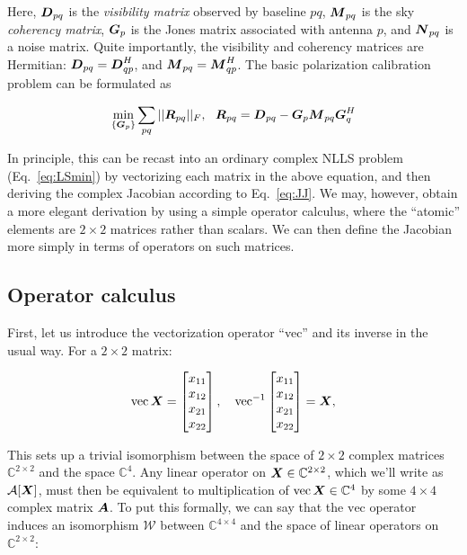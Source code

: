 \documentclass[useAMS,usenatbib]{mn2e}
\makeatletter
\newcommand{\COMPLEX}{\mathbb{C}}
\newcommand{\mat}[1]{{\bmath{#1}}}
\newcommand{\DD}{\mat{D}}
\newcommand{\MM}{\mat{M}}
\newcommand{\RR}{\mat{R}}
\newcommand{\GG}{\mat{G}}
\newcommand{\Matrix}[2]{\left [ \begin{array}{@{}#1@{}}#2\end{array} \right ]}
\makeatother
\begin{document}
Here, $\DD_{pq}$ is the \emph{visibility matrix} observed by baseline $pq$, $\MM_{pq}$ is the sky \emph{coherency matrix}, $\GG_p$ is the Jones matrix associated with antenna $p$, and $\mat{N}_{pq}$ is a noise matrix. Quite importantly, the visibility and coherency matrices are Hermitian: 
$\DD_{pq}=\DD^H_{qp}$, and $\MM_{pq}=\MM^H_{qp}$. The basic polarization calibration problem can be formulated as

\begin{equation}
\label{eq:cal:DI:pol}
\min_{\{\GG_p\}}\sum_{pq}||\RR_{pq}||_F,~~
\RR_{pq} = \DD_{pq}-\GG_p \MM_{pq} \GG^H_q
\end{equation}



In principle, this can be recast into an ordinary complex NLLS problem (Eq.~\ref{eq:LSmin}) by vectorizing each 
matrix in the above equation,  and then deriving the complex Jacobian according to Eq.~\ref{eq:JJ}. We may, however, 
obtain a more elegant derivation by using a simple operator calculus, where the ``atomic'' elements are $2\times2$ matrices 
rather than scalars. We can then define the Jacobian more simply in terms of operators on such matrices. 

\subsection{Operator calculus}

First, let us introduce the vectorization operator ``vec'' and its inverse in the usual way. For a $2\times2$ matrix:

\newcommand{\VEC}[1]{\mathrm{vec}\,{#1}}
\newcommand{\VECINV}[1]{\mathrm{vec}^{-1}\,{#1}}

\[
\VEC{\mat{X}} = \Matrix{c}{x_{11}\\x_{12}\\x_{21}\\x_{22}},~~~
\VECINV{\Matrix{c}{x_{11}\\x_{12}\\x_{21}\\x_{22}}} = \mat{X},
\]

This sets up a trivial isomorphism between the space of $2\times2$ complex matrices $\COMPLEX^{2\times2}$ and the space 
$\COMPLEX^4$. Any linear operator on $\mat{X} \in \COMPLEX^{2\times2}$, which we'll write as $\mathcal{A}[\mat{X}]$, 
must then be equivalent to  multiplication of $\VEC{\mat{X}} \in \COMPLEX^4$ by some $4\times 4$ complex matrix $\mat A$. To put this formally, we can say that the $\mathrm{vec}$ operator induces an isomorphism  $\mathcal{W}$ 
between $\COMPLEX^{4\times4}$ and the space of linear 
operators on $\COMPLEX^{2\times2}$:
\end{document}
